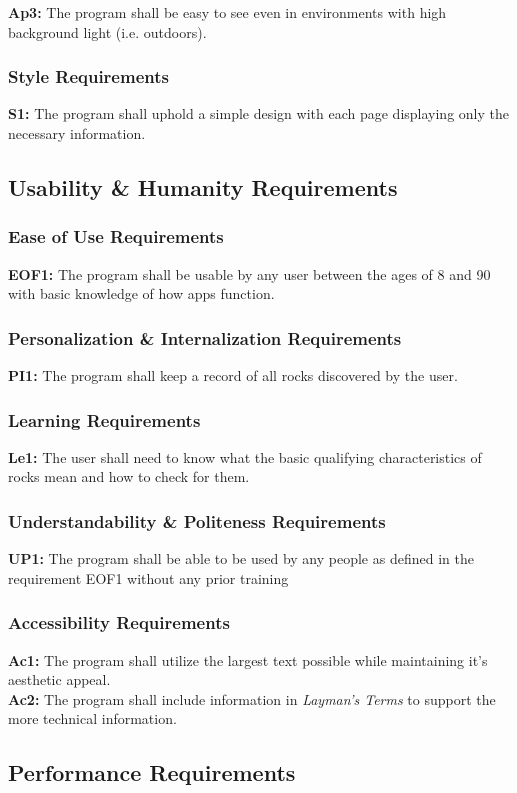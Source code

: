 \documentclass[titlepage]{article}
\begin{document}
\noindent\textbf{Ap3:} The program shall be easy to see even in environments with high background light (i.e. outdoors).

\subsubsection{Style Requirements}
\textbf{S1:} The program shall uphold a simple design with each page displaying only the necessary information.

\subsection{Usability \& Humanity Requirements}
\subsubsection{Ease of Use Requirements}
\textbf{EOF1:} The program shall be usable by any user between the ages of 8 and 90 with basic knowledge of how apps function.
\subsubsection{Personalization \& Internalization Requirements}
\textbf{PI1:} The program shall keep a record of all rocks discovered by the user.
\subsubsection{Learning Requirements}
\textbf{Le1:} The user shall need to know what the basic qualifying characteristics of rocks mean and how to check for them.
\subsubsection{Understandability \& Politeness Requirements}
\textbf{UP1:} The program shall be able to be used by any people as defined in the requirement EOF1 without any prior training
\subsubsection{Accessibility Requirements}
\textbf{Ac1:} The program shall utilize the largest text possible while maintaining it's aesthetic appeal.\\

\noindent\textbf{Ac2:} The program shall include information in \textit{Layman's Terms} to support the more technical information.

\subsection{Performance Requirements}
\end{document}

